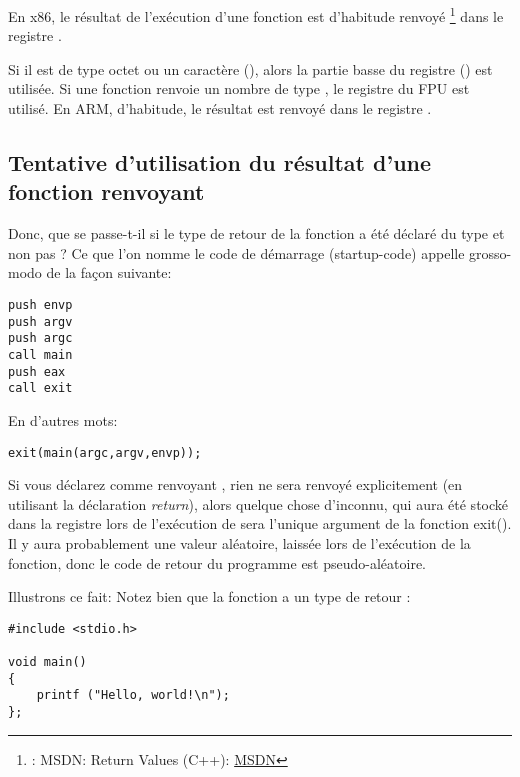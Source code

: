 ﻿


En x86, le résultat de l'exécution d'une fonction est d'habitude renvoyé
\footnote{\Seealso: MSDN: Return Values (C++): \href{http://msdn.microsoft.com/en-us/library/7572ztz4.aspx}{MSDN}}
dans le registre \EAX.

Si il est de type octet ou un caractère (\Tchar), alors la partie basse du registre
\EAX (\AL) est utilisée.
Si une fonction renvoie un nombre de type \Tfloat, le registre  du FPU est utilisé. %
En ARM, d'habitude, le résultat est renvoyé dans le registre .

\subsection{Tentative d'utilisation du résultat d'une fonction renvoyant \Tvoid}
\label{UseResultOfVoidFunc}

Donc, que se passe-t-il si le type de retour de la fonction \main a été déclaré
du type \Tvoid et non pas \Tint?
Ce que l'on nomme le code de démarrage (startup-code) appelle \main grosso-modo de
la façon suivante:

\begin{lstlisting}[style=customasmx86]
push envp
push argv
push argc
call main
push eax
call exit
\end{lstlisting}

En d'autres mots:

\begin{lstlisting}[style=customc]
exit(main(argc,argv,envp));
\end{lstlisting}

Si vous déclarez \main comme renvoyant \Tvoid, rien ne sera renvoyé explicitement
(en utilisant la déclaration \emph{return}), alors quelque chose d'inconnu, qui aura
été stocké dans la registre \EAX lors de l'exécution de \main sera l'unique argument
de la fonction exit().
Il y aura probablement une valeur aléatoire, laissée lors de l'exécution de la fonction,
donc le code de retour du programme est pseudo-aléatoire.
\par
Illustrons ce fait:
Notez bien  que la fonction \main a un type de retour \Tvoid:

\begin{lstlisting}[style=customc]
#include <stdio.h>

void main()
{
	printf ("Hello, world!\n");
};
\end{lstlisting}

